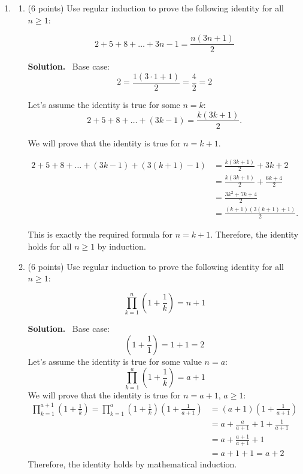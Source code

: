 \documentclass[10pt,letterpaper]{article}
\newenvironment{solution}
  {\par\noindent\textbf{Solution.}\ }
  {\par}
\begin{document}
\begin{enumerate}

\item
\begin{enumerate}
\item (6 points)
Use regular induction to prove the following identity for all $n\geq 1$:

$$2+5+8+\dots + 3n-1 = \frac{n(3n+1)}{2}$$

\begin{solution}
Base case:
\[
2=\frac{1(3\cdot1+1)}{2}=\frac{4}{2}=2
\]

Let's assume the identity is true for some \(n=k\):
\[
2+5+8+\dots+(3k-1)=\frac{k(3k+1)}{2}.
\]

We will prove that the identity is true for \(n=k+1\).

\begin{align*}
2+5+8+\dots+(3k-1)+(3(k+1)-1)
&= \frac{k(3k+1)}{2}+3k+2 \\
&= \frac{k(3k+1)}{2}+\frac{6k+4}{2} \\
&= \frac{3k^2+7k+4}{2} \\
&= \boxed{\frac{(k+1)(3(k+1)+1)}{2}}.
\end{align*}

This is exactly the required formula for \(n=k+1\).
Therefore, the identity holds for all \(n\geq1\) by induction.
\qedsymbol

\end{solution}

\item (6 points)
Use regular induction to prove the following identity for all $n\geq 1$:

$$\prod_{k=1}^n \left(1 + \frac{1}{k}\right) = n+1$$

\begin{solution}
  Base case:
  \[
  \left(1+\frac{1}{1}\right)=1+1=2
  \]
  Let's assume the identity is true for some value \(n=a\):
  \[
  \prod_{k=1}^a \left(1 + \frac{1}{k}\right) = a + 1
  \]
  We will prove that the identity is true for \(n=a+1\), \(a \geq 1\):
  \begin{align*}
  \prod_{k=1}^{a+1} \left(1 + \frac{1}{k}\right) = \prod_{k=1}^{a} \left(1 + \frac{1}{k}\right) \left(1 + \frac{1}{a+1}\right)
  &= (a + 1)\left(1 + \frac{1}{a+1}\right)\\
  &= a + \frac{a}{a+1} + 1 + \frac{1}{a+1}\\
  &= a + \frac{a+1}{a+1} + 1\\
  &= a + 1 + 1 = \boxed{a + 2}
  \end{align*}
  Therefore, the identity holds by mathematical induction.
\end{solution}
\end{enumerate}


\end{enumerate}
\end{document}
